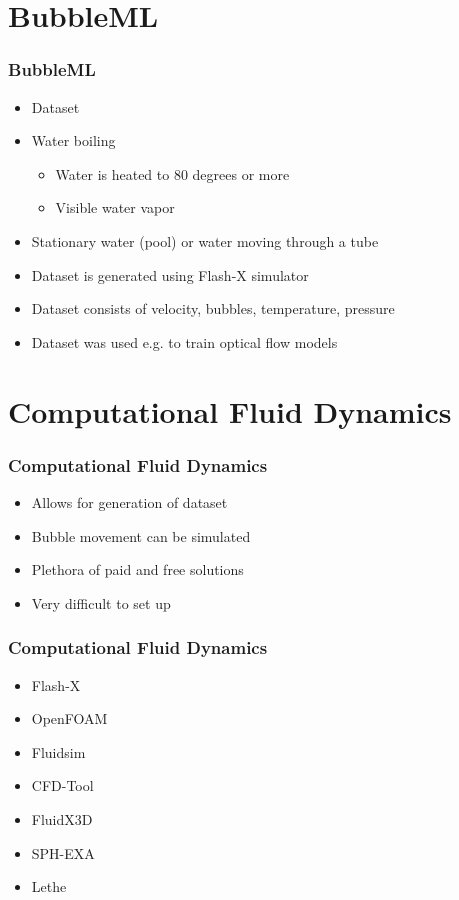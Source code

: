 \documentclass{beamer}
\begin{document}
\section{BubbleML}

\begin{frame}
    \frametitle{BubbleML}
    \begin{itemize}
        \item Dataset
        \item Water boiling
        \begin{itemize}
            \item Water is heated to 80 degrees or more
            \item Visible water vapor
        \end{itemize}
        \item Stationary water (pool) or water moving through a tube
        \item Dataset is generated using Flash-X simulator
        \item Dataset consists of velocity, bubbles, temperature, pressure
        \item Dataset was used e.g. to train optical flow models
    \end{itemize}
\end{frame}

\section{Computational Fluid Dynamics}

\begin{frame}
    \frametitle{Computational Fluid Dynamics}
    \begin{itemize}
        \item Allows for generation of dataset
        \item Bubble movement can be simulated
        \item Plethora of paid and free solutions
        \item Very difficult to set up
    \end{itemize}
\end{frame}

\begin{frame}
    \frametitle{Computational Fluid Dynamics}
    \begin{itemize}
        \item Flash-X
        \item OpenFOAM
        \item Fluidsim
        \item CFD-Tool
        \item FluidX3D
        \item SPH-EXA
        \item Lethe
    \end{itemize}
\end{frame}
\end{document}
